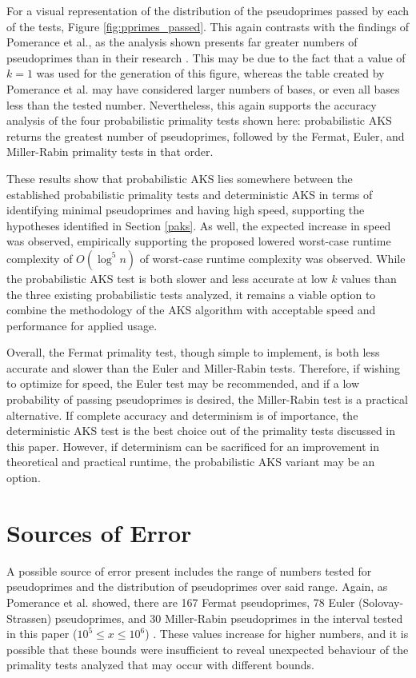 \documentclass{article}
\begin{document}
For a visual representation of the distribution of the pseudoprimes passed by each of the tests, Figure \ref{fig:pprimes_passed}. This again contrasts with the findings of Pomerance et al., as the analysis shown presents far greater numbers of pseudoprimes than in their research \cite{pomerance_pseudoprimes_1980}. This may be due to the fact that a value of $k=1$ was used for the generation of this figure, whereas the table created by Pomerance et al. may have considered larger numbers of bases, or even all bases less than the tested number. Nevertheless, this again supports the accuracy analysis of the four probabilistic primality tests shown here: probabilistic AKS returns the greatest number of pseudoprimes, followed by the Fermat, Euler, and Miller-Rabin primality tests in that order. 

These results show that probabilistic AKS lies somewhere between the established probabilistic primality tests and deterministic AKS in terms of identifying minimal pseudoprimes and having high speed, supporting the hypotheses identified in Section \ref{paks}. As well, the expected increase in speed was observed, empirically supporting the proposed lowered worst-case runtime complexity of $O(\log^5{n})$ of worst-case runtime complexity was observed. While the probabilistic AKS test is both slower and less accurate at low $k$ values than the three existing probabilistic tests analyzed, it remains a viable option to combine the methodology of the AKS algorithm with acceptable speed and performance for applied usage.

Overall, the Fermat primality test, though simple to implement, is both less accurate and slower than the Euler and Miller-Rabin tests. Therefore, if wishing to optimize for speed, the Euler test may be recommended, and if a low probability of passing pseudoprimes is desired, the Miller-Rabin test is a practical alternative. If complete accuracy and determinism is of importance, the deterministic AKS test is the best choice out of the primality tests discussed in this paper. However, if determinism can be sacrificed for an improvement in theoretical and practical runtime, the probabilistic AKS variant may be an option.

\section{Sources of Error}
\label{soe}
A possible source of error present includes the range of numbers tested for pseudoprimes and the distribution of pseudoprimes over said range.
Again, as Pomerance et al. showed, there are 167 Fermat pseudoprimes, 78 Euler (Solovay-Strassen) pseudoprimes, and 30 Miller-Rabin pseudoprimes in the interval tested in this paper ($10^5 \leq x \leq 10^6$) \cite{pomerance_pseudoprimes_1980}. These values increase for higher numbers, and it is possible that these bounds were insufficient to reveal unexpected behaviour of the primality tests analyzed that may occur with different bounds.
\end{document}
